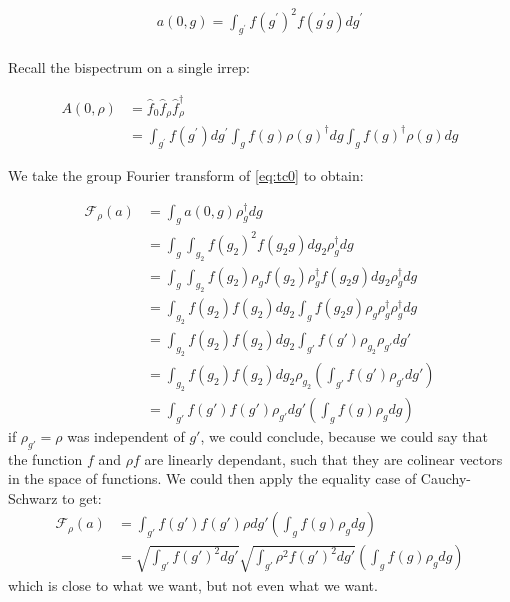 \begin{align}
\label{eq:tc0}
    a(0, g) = \int_{g^{\prime}} f(g^{\prime})^2 f(g^{\prime} g) dg^{\prime} \\
\end{align}

Recall the bispectrum on a single irrep:

\begin{align}
    A(0, \rho) &= \hat{f}_0 \hat{f}_{\rho} \hat{f}_{\rho}^{\dagger} \\
    &= \int_{g^{\prime}} f(g^{\prime}) dg^{\prime} \int_g f(g) \rho(g)^{\dagger} dg \int_g f(g)^{\dagger} \rho(g) dg
\end{align}

We take the group Fourier transform of \ref{eq:tc0} to obtain:

\begin{align}
    \mathcal{F}_{\rho}(a) &= \int_{g} a(0, g) \rho_{g}^{\dagger} dg \\
    &= \int_{g} \int_{g_2} f(g_2)^2 f(g_2 g) dg_2 \rho_{g}^{\dagger} dg \\
    &= \int_{g} \int_{g_2} f(g_2) \rho_g f(g_2) \rho_g^{\dagger} f(g_2 g) dg_2 \rho_{g}^{\dagger} dg \\
    &= \int_{g_2} f(g_2) f(g_2) dg_2  \int_{g} f(g_2 g)\rho_g  \rho_g^{\dagger}\rho_{g}^{\dagger} dg \\
    &= \int_{g_2} f(g_2) f(g_2) dg_2  \int_{g'} f(g')\rho_{g_2}\rho_{g'} dg' \\
&= \int_{g_2} f(g_2) f(g_2) dg_2  \rho_{g_2} \left(\int_{g'} f(g')\rho_{g'} dg'\right) \\
&= \int_{g'} f(g')f(g')  \rho_{g'} dg'  \left(\int_{g} f(g)\rho_{g} dg\right)
\end{align}
if $\rho_{g'} = \rho$ was independent of $g'$, we could conclude, because we could say that the function $f$ and $\rho f$ are linearly dependant, such that they are colinear vectors in the space of functions. We could then apply the equality case of Cauchy-Schwarz to get:
\begin{align}
\mathcal{F}_{\rho}(a)
    &= \int_{g'} f(g')f(g')  \rho dg'  \left(\int_{g} f(g)\rho_{g} dg\right) \\
    &= \sqrt{\int_{g'} f(g')^2dg'} \sqrt{\int_{g'} \rho^2 f(g')^2dg'}  \left(\int_{g} f(g)\rho_{g} dg\right)
\end{align}
which is close to what we want, but not even what we want.


